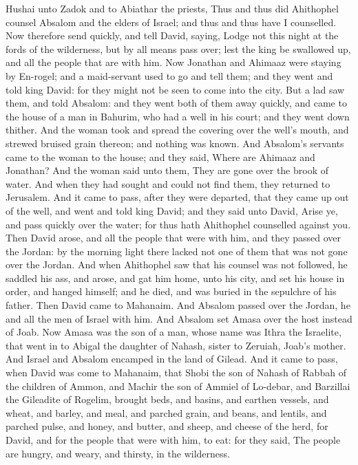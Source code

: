 Hushai unto Zadok and to Abiathar the priests, Thus and thus did Ahithophel counsel Absalom and the elders of Israel; and thus and thus have I counselled. Now therefore send quickly, and tell David, saying, Lodge not this night at the fords of the wilderness, but by all means pass over; lest the king be swallowed up, and all the people that are with him. Now Jonathan and Ahimaaz were staying by En-rogel; and a maid-servant used to go and tell them; and they went and told king David: for they might not be seen to come into the city. But a lad saw them, and told Absalom: and they went both of them away quickly, and came to the house of a man in Bahurim, who had a well in his court; and they went down thither. And the woman took and spread the covering over the well’s mouth, and strewed bruised grain thereon; and nothing was known. And Absalom’s servants came to the woman to the house; and they said, Where are Ahimaaz and Jonathan? And the woman said unto them, They are gone over the brook of water. And when they had sought and could not find them, they returned to Jerusalem.  And it came to pass, after they were departed, that they came up out of the well, and went and told king David; and they said unto David, Arise ye, and pass quickly over the water; for thus hath Ahithophel counselled against you. Then David arose, and all the people that were with him, and they passed over the Jordan: by the morning light there lacked not one of them that was not gone over the Jordan. And when Ahithophel saw that his counsel was not followed, he saddled his ass, and arose, and gat him home, unto his city, and set his house in order, and hanged himself; and he died, and was buried in the sepulchre of his father.  Then David came to Mahanaim. And Absalom passed over the Jordan, he and all the men of Israel with him. And Absalom set Amasa over the host instead of Joab. Now Amasa was the son of a man, whose name was Ithra the Israelite, that went in to Abigal the daughter of Nahash, sister to Zeruiah, Joab’s mother. And Israel and Absalom encamped in the land of Gilead.  And it came to pass, when David was come to Mahanaim, that Shobi the son of Nahash of Rabbah of the children of Ammon, and Machir the son of Ammiel of Lo-debar, and Barzillai the Gileadite of Rogelim, brought beds, and basins, and earthen vessels, and wheat, and barley, and meal, and parched grain, and beans, and lentils, and parched pulse, and honey, and butter, and sheep, and cheese of the herd, for David, and for the people that were with him, to eat: for they said, The people are hungry, and weary, and thirsty, in the wilderness. 

